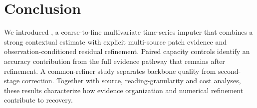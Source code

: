 \section{Conclusion}\label{sec:conclusion}
We introduced \Model, a coarse-to-fine multivariate time-series imputer that combines a strong contextual estimate with explicit multi-source patch evidence and observation-conditioned residual refinement. Paired capacity controls identify an accuracy contribution from the full evidence pathway that remains after refinement. A common-refiner study separates backbone quality from second-stage correction. Together with source, reading-granularity and cost analyses, these results characterize how evidence organization and numerical refinement contribute to recovery.
